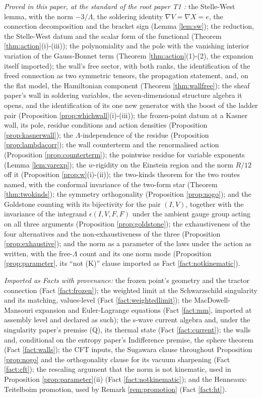 \documentclass[11pt]{article}
\theoremstyle{definition}
\begin{document}
\emph{Proved in this paper, at the standard of the root paper T1 \cite{ButlerT1}:} the Stelle-West lemma, with the norm $-3/\Lambda$, the soldering identity $\nabla V = \nabla X = e$, the connection decomposition and the bracket sign (Lemma \ref{lem:sw}); the reduction, the Stelle-West datum and the scalar form of the functional (Theorem \ref{thm:action}(i)-(iii)); the polynomiality and the pole with the vanishing interior variation of the Gauss-Bonnet term (Theorem \ref{thm:action}(1)-(2), the expansion itself imported); the wall's free sector, with both ranks, the identification of the freed connection as two symmetric tensors, the propagation statement, and, on the flat model, the Hamiltonian component (Theorem \ref{thm:wallfree}); the sheaf paper's wall in soldering variables, the seven-dimensional structure algebra it opens, and the identification of its one new generator with the boost of the ladder pair (Proposition \ref{prop:whichwall}(i)-(iii)); the frozen-point datum at a Kasner wall, its pole, residue conditions and action densities (Proposition \ref{prop:kasnerwall}); the $\Lambda$-independence of the residue (Proposition \ref{prop:lambdacorr}); the wall counterterm and the renormalised action (Proposition \ref{prop:counterterm}); the pointwise residue for variable exponents (Lemma \ref{lem:varexp}); the $w$-rigidity on the Einstein region and the norm $R/12$ off it (Proposition \ref{prop:w}(i)-(ii)); the two-kinds theorem for the two routes named, with the conformal invariance of the two-form star (Theorem \ref{thm:twokinds}); the symmetry orthogonality (Proposition \ref{prop:nogo}); and the Goldstone counting with its bijectivity for the pair $(I,V)$, together with the invariance of the integrand $\epsilon(I,V,F,F)$ under the ambient gauge group acting on all three arguments (Proposition \ref{prop:goldstone}); the exhaustiveness of the four alternatives and the non-exhaustiveness of the three (Proposition \ref{prop:exhaustive}); and the norm as a parameter of the laws under the action as written, with the free-$\Lambda$ count and its one norm mode (Proposition \ref{prop:parameter}, its ``not (K)'' clause imported as Fact \ref{fact:notkinematic}).

\emph{Imported as Facts with provenance:} the frozen point's geometry and the tractor connection (Fact \ref{fact:frozen}); the weighted limit at the Schwarzschild singularity and its matching, values-level (Fact \ref{fact:weightedlimit}); the MacDowell-Mansouri expansion and Euler-Lagrange equations (Fact \ref{fact:mm}, imported at assembly level and declared as such); the s-wave current algebra and, under the singularity paper's premise (Q), its thermal state (Fact \ref{fact:current}); the walls and, conditional on the entropy paper's Indifference premise, the sphere theorem (Fact \ref{fact:walls}); the CFT inputs, the Sugawara clause throughout Proposition \ref{prop:nogo} and the orthogonality clause for its vacuum sharpening (Fact \ref{fact:cft}); the rescaling argument that the norm is not kinematic, used in Proposition \ref{prop:parameter}(ii) (Fact \ref{fact:notkinematic}); and the Henneaux-Teitelboim promotion, used by Remark \ref{rem:promotion} (Fact \ref{fact:ht}).
\end{document}
